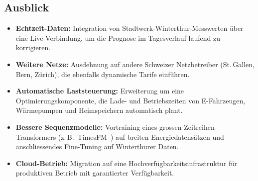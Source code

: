 \documentclass[sigconf]{acmart}
\begin{document}
\subsection{Ausblick}

\begin{itemize}
  \item \textbf{Echtzeit-Daten:} Integration von Stadtwerk-Winterthur-Messwerten
        \"uber eine Live-Verbindung, um die Prognose im Tagesverlauf
        laufend zu korrigieren.
  \item \textbf{Weitere Netze:} Ausdehnung auf andere Schweizer Netzbetreiber
        (St.\,Gallen, Bern, Z\"urich), die ebenfalls dynamische Tarife einf\"uhren.
  \item \textbf{Automatische Laststeuerung:} Erweiterung um eine
        Optimierungskomponente, die Lade- und Betriebszeiten von E-Fahrzeugen,
        W\"armepumpen und Heimspeichern automatisch plant.
  \item \textbf{Bessere Sequenzmodelle:} Vortraining eines grossen
        Zeitreihen-Transformers (z.\,B.\ TimesFM~\cite{TimesFM2024}) auf
        breiten Energiedatens\"atzen und anschliessendes Fine-Tuning auf
        Winterthurer Daten.
  \item \textbf{Cloud-Betrieb:} Migration auf eine Hochverf\"ugbarkeits\-infrastruktur
        f\"ur produktiven Betrieb mit garantierter Verf\"ugbarkeit.
\end{itemize}

\balance
\end{document}
